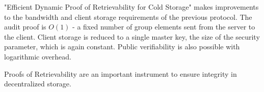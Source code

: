 "Efficient Dynamic Proof of Retrievability for Cold Storage" makes improvements to the bandwidth and
client storage requirements of the previous protocol.
The audit proof is $O(1)$ - a fixed number of group elements sent from the server to the client.
Client storage is reduced to a single master key, the size of the security parameter,
which is again constant.
Public verifiability is also possible with logarithmic overhead.

Proofs of Retrievability are an important instrument to ensure integrity in decentralized storage.
